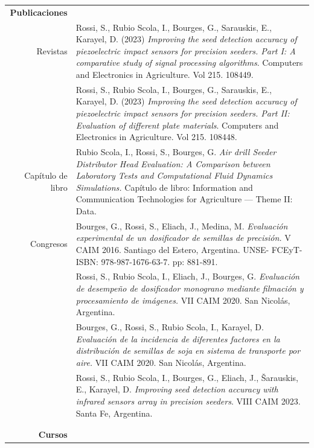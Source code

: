 \documentclass[a4paper,10pt, sans]{article}
\begin{document}
\begin{table}[H]
\begin{tabularx}{\textwidth}{r X}
    \textbf{Publicaciones } & {} \\ [1ex]
    {Revistas} & {Rossi, S., Rubio Scola, I., Bourges, G., Sarauskis, E., Karayel, D. (2023) \textit{Improving the seed detection accuracy of piezoelectric impact sensors for precision seeders. Part I: A comparative study of signal processing algorithms}. Computers and Electronics in Agriculture. Vol 215. 108449.} \\ [1ex]
      {} & {Rossi, S., Rubio Scola, I., Bourges, G., Sarauskis, E., Karayel, D. (2023) \textit{Improving the seed detection accuracy of piezoelectric impact sensors for precision seeders. Part II: Evaluation of different plate materials}. Computers and Electronics in Agriculture. Vol 215. 108448.} \\ [1ex]
    {Capítulo de libro} & Rubio Scola, I., Rossi, S., Bourges, G. \textit{Air drill Seeder Distributor Head Evaluation: A Comparison between Laboratory Tests and Computational Fluid Dynamics Simulations.} Capítulo de libro: Information and Communication Technologies for Agriculture — Theme II: Data. \\ [1ex]
    Congresos & Bourges, G., Rossi, S., Eliach, J., Medina, M. \textit{Evaluación experimental de un dosificador de semillas de precisión.} V CAIM 2016. Santiago del Estero, Argentina. UNSE- FCEyT- ISBN: 978-987-1676-63-7. pp: 881-891. \\  [1ex]
      {} & Rossi, S., Rubio Scola, I., Eliach, J., Bourges, G. \textit{Evaluación de desempeño de dosificador monograno mediante filmación y procesamiento de imágenes.} VII CAIM 2020. San Nicolás, Argentina. \\  [1ex]
      {} & Bourges, G., Rossi, S., Rubio Scola, I., Karayel, D. \textit{Evaluación de la incidencia de diferentes factores en la distribución de semillas de soja en sistema de transporte por aire.} VII CAIM 2020. San Nicolás, Argentina.  \\  [1ex]
      {} & {Rossi, S., Rubio Scola, I., Bourges, G., Eliach, J., Šarauskis, E., Karayel, D. \textit{Improving seed detection accuracy with infrared sensors array in precision seeders}. VIII CAIM 2023. Santa Fe, Argentina.} \\ \\ \hline \\
    

\textbf{Cursos} & {}\\ [1ex]
    

\end{tabularx}
\end{table}
\end{document}
